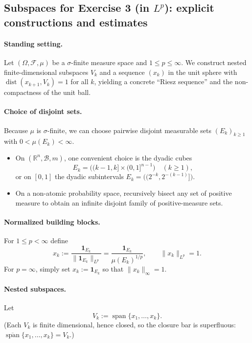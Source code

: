 \documentclass[12pt,a4paper]{article}
\theoremstyle{plain}
\theoremstyle{definition}
\theoremstyle{remark}
\theoremstyle{remark}
\theoremstyle{definition}
\begin{document}
	
	\subsection*{Subspaces for Exercise 3 (in $L^p$): explicit constructions and estimates}
	
	\paragraph{Standing setting.}
	Let $(\Omega,\mathcal{F},\mu)$ be a $\sigma$-finite measure space and $1\le p\le\infty$.
	We construct nested finite-dimensional subspaces $V_k$ and a sequence $(x_k)$ in the unit sphere
	with $\operatorname{dist}(x_{k+1},V_k)=1$ for all $k$, yielding a concrete ``Riesz sequence''
	and the non-compactness of the unit ball.
	
	\bigskip
	
	\paragraph{Choice of disjoint sets.}
	Because $\mu$ is $\sigma$-finite, we can choose pairwise disjoint measurable sets
	$(E_k)_{k\ge1}$ with $0<\mu(E_k)<\infty$.
	\begin{itemize}
		\item On $(\mathbb{R}^n,\mathcal{B},m)$, one convenient choice is the dyadic cubes
		\[
		E_k = \bigl((k-1,k]\times(0,1]^{n-1}\bigr) \quad (k\ge1),
		\]
		or on $[0,1]$ the dyadic subintervals
		$E_k = \bigl((2^{-k},2^{-(k-1)}]\bigr)$.
		\item On a non-atomic probability space, recursively bisect any set of positive measure to obtain
		an infinite disjoint family of positive-measure sets.
	\end{itemize}
	
	\bigskip
	
	\paragraph{Normalized building blocks.}
	For $1\le p<\infty$ define
	\[
	x_k := \frac{\mathbf{1}_{E_k}}{\|\mathbf{1}_{E_k}\|_{L^p}}
	= \frac{\mathbf{1}_{E_k}}{\mu(E_k)^{1/p}},
	\qquad \|x_k\|_{L^p}=1.
	\]
	For $p=\infty$, simply set $x_k:=\mathbf{1}_{E_k}$ so that $\|x_k\|_\infty=1$.
	
	\bigskip
	
	\paragraph{Nested subspaces.}
	Let
	\[
	V_k := \operatorname{span}\{x_1,\dots,x_k\}.
	\]
	(Each $V_k$ is finite dimensional, hence closed, so the closure bar is superfluous:
	$\overline{\operatorname{span}}\{x_1,\dots,x_k\}=V_k$.)
	
\end{document}
